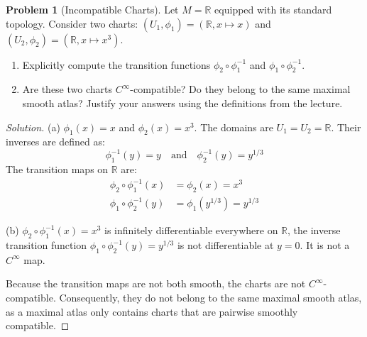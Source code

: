 \documentclass[12pt, a4paper]{article}
\theoremstyle{definition}
\newtheorem{problem}{Problem}
\newenvironment{solution}
  {\renewcommand\qedsymbol{$\blacksquare$}\begin{proof}[Solution]}
  {\end{proof}}
\newcommand{\RR}{\mathbb{R}}
\begin{document}
\begin{problem}[Incompatible Charts]
Let $M = \RR$ equipped with its standard topology. Consider two charts: $(U_1, \phi_1) = (\RR, x \mapsto x)$ and $(U_2, \phi_2) = (\RR, x \mapsto x^3)$.
\begin{enumerate}
    \item[(a)] Explicitly compute the transition functions $\phi_2 \circ \phi_1^{-1}$ and $\phi_1 \circ \phi_2^{-1}$.
    \item[(b)] Are these two charts $C^\infty$-compatible? Do they belong to the same maximal smooth atlas? Justify your answers using the definitions from the lecture.
\end{enumerate}
\end{problem}
\begin{solution}
(a) $\phi_1(x) = x$ and $\phi_2(x) = x^3$. The domains are $U_1 = U_2 = \RR$. Their inverses are defined as:
\[
\phi_1^{-1}(y) = y \quad \text{and} \quad \phi_2^{-1}(y) = y^{1/3}
\]
The transition maps on $\RR$ are:
\begin{align*}
\phi_2 \circ \phi_1^{-1}(x) &= \phi_2(x) = x^3 \\
\phi_1 \circ \phi_2^{-1}(y) &= \phi_1(y^{1/3}) = y^{1/3}
\end{align*}

(b) $\phi_2 \circ \phi_1^{-1}(x) = x^3$ is infinitely differentiable everywhere on $\RR$, the inverse transition function $\phi_1 \circ \phi_2^{-1}(y) = y^{1/3}$ is not differentiable at $y = 0$. It is not a $C^\infty$ map.

Because the transition maps are not both smooth, the charts are not $C^\infty$-compatible. Consequently, they do not belong to the same maximal smooth atlas, as a maximal atlas only contains charts that are pairwise smoothly compatible.
\end{solution}

\vfill\newpage
\end{document}
